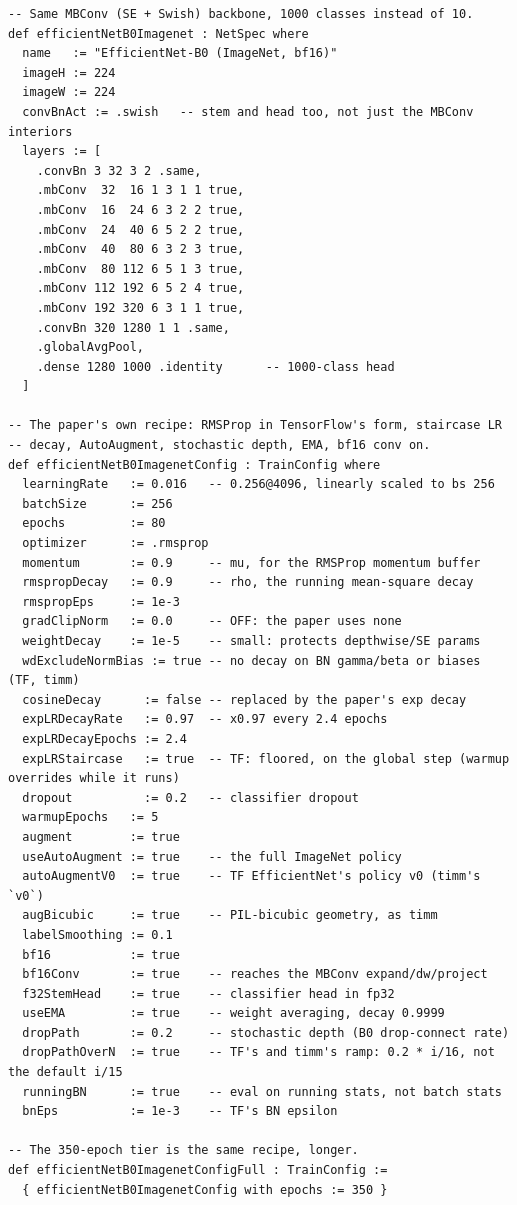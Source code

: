 \begin{verbatim}
-- Same MBConv (SE + Swish) backbone, 1000 classes instead of 10.
def efficientNetB0Imagenet : NetSpec where
  name   := "EfficientNet-B0 (ImageNet, bf16)"
  imageH := 224
  imageW := 224
  convBnAct := .swish   -- stem and head too, not just the MBConv interiors
  layers := [
    .convBn 3 32 3 2 .same,
    .mbConv  32  16 1 3 1 1 true,
    .mbConv  16  24 6 3 2 2 true,
    .mbConv  24  40 6 5 2 2 true,
    .mbConv  40  80 6 3 2 3 true,
    .mbConv  80 112 6 5 1 3 true,
    .mbConv 112 192 6 5 2 4 true,
    .mbConv 192 320 6 3 1 1 true,
    .convBn 320 1280 1 1 .same,
    .globalAvgPool,
    .dense 1280 1000 .identity      -- 1000-class head
  ]

-- The paper's own recipe: RMSProp in TensorFlow's form, staircase LR
-- decay, AutoAugment, stochastic depth, EMA, bf16 conv on.
def efficientNetB0ImagenetConfig : TrainConfig where
  learningRate   := 0.016   -- 0.256@4096, linearly scaled to bs 256
  batchSize      := 256
  epochs         := 80
  optimizer      := .rmsprop
  momentum       := 0.9     -- mu, for the RMSProp momentum buffer
  rmspropDecay   := 0.9     -- rho, the running mean-square decay
  rmspropEps     := 1e-3
  gradClipNorm   := 0.0     -- OFF: the paper uses none
  weightDecay    := 1e-5    -- small: protects depthwise/SE params
  wdExcludeNormBias := true -- no decay on BN gamma/beta or biases (TF, timm)
  cosineDecay      := false -- replaced by the paper's exp decay
  expLRDecayRate   := 0.97  -- x0.97 every 2.4 epochs
  expLRDecayEpochs := 2.4
  expLRStaircase   := true  -- TF: floored, on the global step (warmup overrides while it runs)
  dropout          := 0.2   -- classifier dropout
  warmupEpochs   := 5
  augment        := true
  useAutoAugment := true    -- the full ImageNet policy
  autoAugmentV0  := true    -- TF EfficientNet's policy v0 (timm's `v0`)
  augBicubic     := true    -- PIL-bicubic geometry, as timm
  labelSmoothing := 0.1
  bf16           := true
  bf16Conv       := true    -- reaches the MBConv expand/dw/project
  f32StemHead    := true    -- classifier head in fp32
  useEMA         := true    -- weight averaging, decay 0.9999
  dropPath       := 0.2     -- stochastic depth (B0 drop-connect rate)
  dropPathOverN  := true    -- TF's and timm's ramp: 0.2 * i/16, not the default i/15
  runningBN      := true    -- eval on running stats, not batch stats
  bnEps          := 1e-3    -- TF's BN epsilon

-- The 350-epoch tier is the same recipe, longer.
def efficientNetB0ImagenetConfigFull : TrainConfig :=
  { efficientNetB0ImagenetConfig with epochs := 350 }
\end{verbatim}

